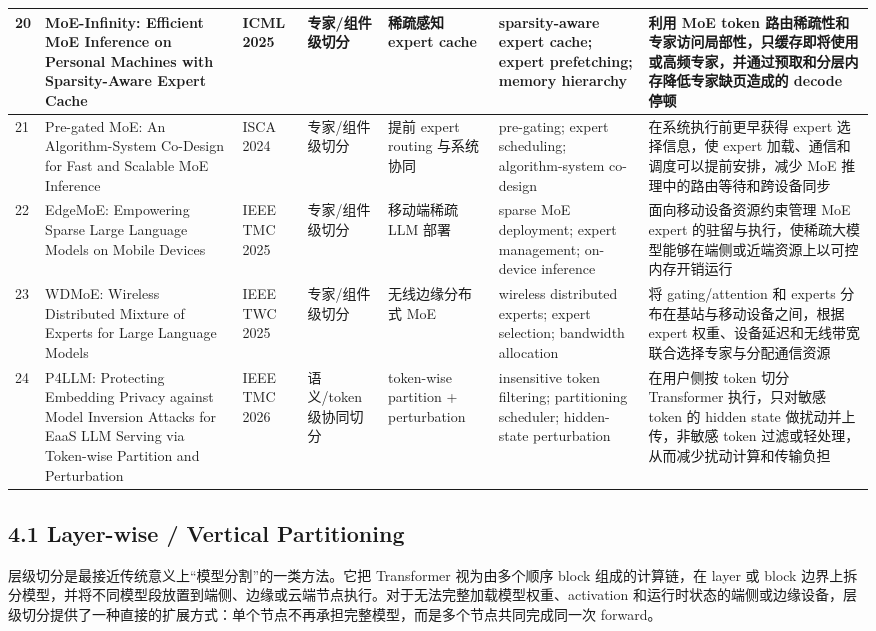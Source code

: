 \documentclass[a4paper,10pt]{ctexart}
\begin{document}
\begin{table}[H]
\begin{tabularx}{\textwidth}{|X|X|X|X|X|X|X|}
20 & MoE-Infinity: Efficient MoE Inference on Personal Machines with Sparsity-Aware Expert Cache & ICML 2025 & 专家/组件级切分 & 稀疏感知 expert cache & sparsity-aware expert cache; expert prefetching; memory hierarchy & 利用 MoE token 路由稀疏性和专家访问局部性，只缓存即将使用或高频专家，并通过预取和分层内存降低专家缺页造成的 decode 停顿 \\ \hline
21 & Pre-gated MoE: An Algorithm-System Co-Design for Fast and Scalable MoE Inference & ISCA 2024 & 专家/组件级切分 & 提前 expert routing 与系统协同 & pre-gating; expert scheduling; algorithm-system co-design & 在系统执行前更早获得 expert 选择信息，使 expert 加载、通信和调度可以提前安排，减少 MoE 推理中的路由等待和跨设备同步 \\ \hline
22 & EdgeMoE: Empowering Sparse Large Language Models on Mobile Devices & IEEE TMC 2025 & 专家/组件级切分 & 移动端稀疏 LLM 部署 & sparse MoE deployment; expert management; on-device inference & 面向移动设备资源约束管理 MoE expert 的驻留与执行，使稀疏大模型能够在端侧或近端资源上以可控内存开销运行 \\ \hline
23 & WDMoE: Wireless Distributed Mixture of Experts for Large Language Models & IEEE TWC 2025 & 专家/组件级切分 & 无线边缘分布式 MoE & wireless distributed experts; expert selection; bandwidth allocation & 将 gating/attention 和 experts 分布在基站与移动设备之间，根据 expert 权重、设备延迟和无线带宽联合选择专家与分配通信资源 \\ \hline
24 & P4LLM: Protecting Embedding Privacy against Model Inversion Attacks for EaaS LLM Serving via Token-wise Partition and Perturbation & IEEE TMC 2026 & 语义/token 级协同切分 & token-wise partition + perturbation & insensitive token filtering; partitioning scheduler; hidden-state perturbation & 在用户侧按 token 切分 Transformer 执行，只对敏感 token 的 hidden state 做扰动并上传，非敏感 token 过滤或轻处理，从而减少扰动计算和传输负担 \\ \hline
\end{tabularx}
\end{table}


\subsection*{4.1 Layer-wise / Vertical Partitioning}

层级切分是最接近传统意义上“模型分割”的一类方法。它把 Transformer 视为由多个顺序 block 组成的计算链，在 layer 或 block 边界上拆分模型，并将不同模型段放置到端侧、边缘或云端节点执行。对于无法完整加载模型权重、activation 和运行时状态的端侧或边缘设备，层级切分提供了一种直接的扩展方式：单个节点不再承担完整模型，而是多个节点共同完成同一次 forward。
\end{document}
